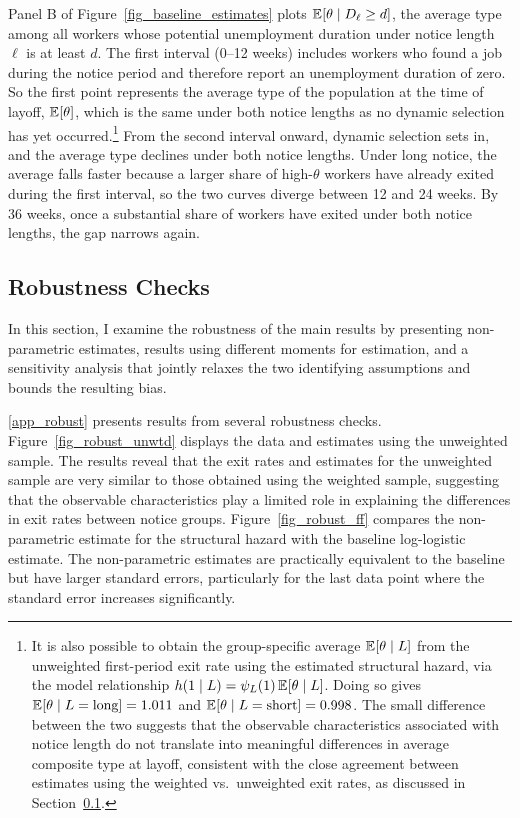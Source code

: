 \documentclass{div}
\begin{document}
Panel B of Figure~\ref{fig_baseline_estimates} plots $\E[\theta \mid D_\ell \geq d]$, the average type among all workers whose potential unemployment duration under notice length $\ell$ is at least $d$. The first interval (0--12 weeks) includes workers who found a job during the notice period and therefore report an unemployment duration of zero. So the first point represents the average type of the population at the time of layoff, $\E[\theta]$, which is the same under both notice lengths as no dynamic selection has yet occurred.\footnote{It is also possible to obtain the group-specific average $\E[\theta \mid L]$ from the unweighted first-period exit rate using the estimated structural hazard, via the model relationship $h(1 \mid L) = \psi_L(1)\,\E[\theta \mid L]$. Doing so gives $\E[\theta \mid L=\text{long}] = 1.011$ and $\E[\theta \mid L=\text{short}] = 0.998$. The small difference between the two suggests that the observable characteristics associated with notice length do not translate into meaningful differences in average composite type at layoff, consistent with the close agreement between estimates using the weighted vs.\ unweighted exit rates, as discussed in Section~\ref{subsec_robust}.} From the second interval onward, dynamic selection sets in, and the average type declines under both notice lengths. Under long notice, the average falls faster because a larger share of high-$\theta$ workers have already exited during the first interval, so the two curves diverge between 12 and 24 weeks. By 36 weeks, once a substantial share of workers have exited under both notice lengths, the gap narrows again.



\subsection{Robustness Checks}\label{subsec_robust}

In this section, I examine the robustness of the main results by presenting non-parametric estimates, results using different moments for estimation, and a sensitivity analysis that jointly relaxes the two identifying assumptions and bounds the resulting bias.

\ref{app_robust} presents results from several robustness checks. Figure~\ref{fig_robust_unwtd} displays the data and estimates using the unweighted sample. The results reveal that the exit rates and estimates for the unweighted sample are very similar to those obtained using the weighted sample, suggesting that the observable characteristics play a limited role in explaining the differences in exit rates between notice groups. Figure~\ref{fig_robust_ff} compares the non-parametric estimate for the structural hazard with the baseline log-logistic estimate. The non-parametric estimates are practically equivalent to the baseline but have larger standard errors, particularly for the last data point where the standard error increases significantly.
\end{document}
